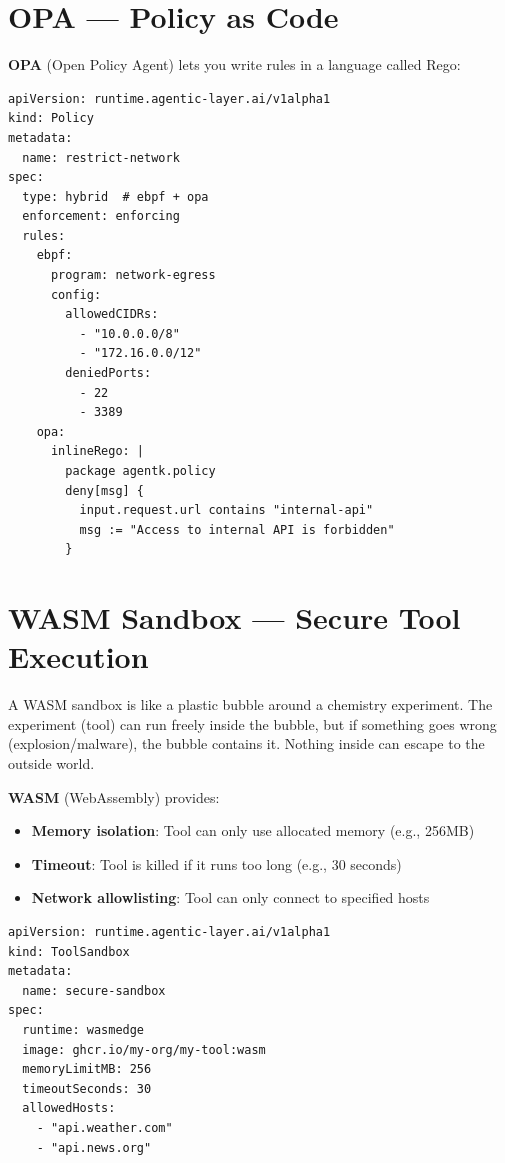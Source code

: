 \documentclass[12pt,a4paper,openany]{report}
\begin{document}
\section{OPA — Policy as Code}

\textbf{OPA} (Open Policy Agent) lets you write rules in a language called Rego:

\begin{lstlisting}[style=yaml, caption={A network policy using eBPF + OPA}]
apiVersion: runtime.agentic-layer.ai/v1alpha1
kind: Policy
metadata:
  name: restrict-network
spec:
  type: hybrid  # ebpf + opa
  enforcement: enforcing
  rules:
    ebpf:
      program: network-egress
      config:
        allowedCIDRs:
          - "10.0.0.0/8"
          - "172.16.0.0/12"
        deniedPorts:
          - 22
          - 3389
    opa:
      inlineRego: |
        package agentk.policy
        deny[msg] {
          input.request.url contains "internal-api"
          msg := "Access to internal API is forbidden"
        }
\end{lstlisting}

\section{WASM Sandbox — Secure Tool Execution}

\begin{analogybox}
A WASM sandbox is like a plastic bubble around a chemistry experiment. The experiment (tool) can run freely inside the bubble, but if something goes wrong (explosion/malware), the bubble contains it. Nothing inside can escape to the outside world.
\end{analogybox}

\textbf{WASM} (WebAssembly) provides:
\begin{itemize}
    \item \textbf{Memory isolation}: Tool can only use allocated memory (e.g., 256MB)
    \item \textbf{Timeout}: Tool is killed if it runs too long (e.g., 30 seconds)
    \item \textbf{Network allowlisting}: Tool can only connect to specified hosts
\end{itemize}

\begin{lstlisting}[style=yaml, caption={A WASM ToolSandbox}]
apiVersion: runtime.agentic-layer.ai/v1alpha1
kind: ToolSandbox
metadata:
  name: secure-sandbox
spec:
  runtime: wasmedge
  image: ghcr.io/my-org/my-tool:wasm
  memoryLimitMB: 256
  timeoutSeconds: 30
  allowedHosts:
    - "api.weather.com"
    - "api.news.org"
\end{lstlisting}
\end{document}
